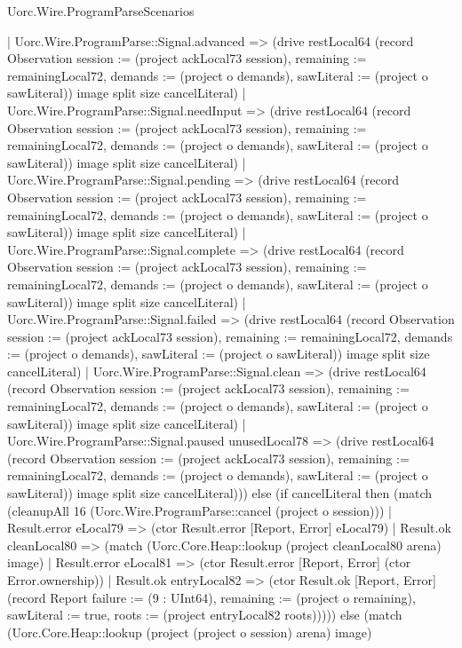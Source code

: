 \begin{lexlean}{Uorc.Wire.ProgramParseScenarios}
\begin{semanticmodule}
{              | Uorc.Wire.ProgramParse::Signal.advanced => (drive restLocal64 (record Observation {session := (project ackLocal73 session), remaining := remainingLocal72, demands := (project o demands), sawLiteral := (project o sawLiteral)}) image split size cancelLiteral)
              | Uorc.Wire.ProgramParse::Signal.needInput => (drive restLocal64 (record Observation {session := (project ackLocal73 session), remaining := remainingLocal72, demands := (project o demands), sawLiteral := (project o sawLiteral)}) image split size cancelLiteral)
              | Uorc.Wire.ProgramParse::Signal.pending => (drive restLocal64 (record Observation {session := (project ackLocal73 session), remaining := remainingLocal72, demands := (project o demands), sawLiteral := (project o sawLiteral)}) image split size cancelLiteral)
              | Uorc.Wire.ProgramParse::Signal.complete => (drive restLocal64 (record Observation {session := (project ackLocal73 session), remaining := remainingLocal72, demands := (project o demands), sawLiteral := (project o sawLiteral)}) image split size cancelLiteral)
              | Uorc.Wire.ProgramParse::Signal.failed => (drive restLocal64 (record Observation {session := (project ackLocal73 session), remaining := remainingLocal72, demands := (project o demands), sawLiteral := (project o sawLiteral)}) image split size cancelLiteral)
              | Uorc.Wire.ProgramParse::Signal.clean => (drive restLocal64 (record Observation {session := (project ackLocal73 session), remaining := remainingLocal72, demands := (project o demands), sawLiteral := (project o sawLiteral)}) image split size cancelLiteral)
              | Uorc.Wire.ProgramParse::Signal.paused unusedLocal78 => (drive restLocal64 (record Observation {session := (project ackLocal73 session), remaining := remainingLocal72, demands := (project o demands), sawLiteral := (project o sawLiteral)}) image split size cancelLiteral))) else (if cancelLiteral then (match (cleanupAll 16 (Uorc.Wire.ProgramParse::cancel (project o session)))
              | Result.error eLocal79 => (ctor Result.error [Report, Error] eLocal79)
              | Result.ok cleanLocal80 => (match (Uorc.Core.Heap::lookup (project cleanLocal80 arena) image)
                | Result.error eLocal81 => (ctor Result.error [Report, Error] (ctor Error.ownership))
                | Result.ok entryLocal82 => (ctor Result.ok [Report, Error] (record Report {failure := (9 : UInt64), remaining := (project o remaining), sawLiteral := true, roots := (project entryLocal82 roots)})))) else (match (Uorc.Core.Heap::lookup (project (project o session) arena) image)
}
\end{semanticmodule}
\end{lexlean}
